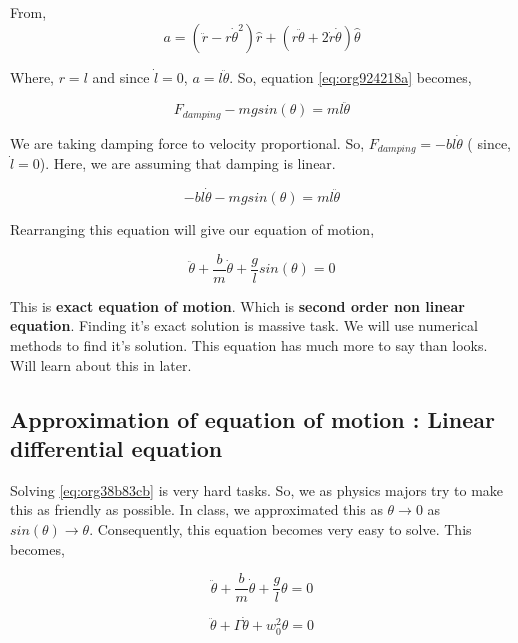 \documentclass[11pt,a4paper]{article}
\begin{document}
From,
\begin{equation*}
\label{eq:orgcb67140}
a = (\ddot{r}-r\dot{\theta}^{2})\hat{r} + (r \ddot{\theta}+2\dot{r}\dot{\theta})\hat{\theta}
\end{equation*}

Where,  \(r=l\) and since \(\dot{l}=0\), \(a=l\ddot{\theta}\). So, equation \ref{eq:org924218a} becomes,

\begin{equation*}
\label{eq:orgff68107}
F_{damping}-mgsin(\theta)=ml\ddot{\theta}
\end{equation*}

We are taking damping force to velocity proportional. So, \(F_{damping}=-bl\dot{\theta}\) ( since, \(\dot{l}=0\)). Here, we are assuming that damping is linear. 

\begin{equation*}
\label{eq:org3933c19}
-bl\dot{\theta}-mgsin(\theta)=ml\ddot{\theta}
\end{equation*}


Rearranging this equation will give our equation of motion,

\begin{equation}
\label{eq:org38b83cb}
\ddot{\theta}+\frac{b}{m}\dot{\theta}+\frac{g}{l}sin(\theta)=0
\end{equation}

This is \textbf{exact equation of motion}. Which is \textbf{second order non linear equation}. Finding it's exact solution is massive task. We will use numerical methods to find it's solution. This equation has much more to say than looks. Will learn about this in later.

\subsection{Approximation of equation of motion : Linear differential equation}
\label{sec:orgb95765f}

Solving \ref{eq:org38b83cb} is very hard tasks. So, we as physics majors try to make this as friendly as possible. In class, we approximated this as \(\theta \to 0\) as \(sin(\theta) \to \theta\). Consequently, this equation becomes very easy to solve. This becomes,

\begin{equation}
\label{eq:org217be5e}
\ddot{\theta}+\frac{b}{m}\dot{\theta}+\frac{g}{l}\theta=0
\end{equation}

\begin{equation}
\label{eq:org7f1424d}
\ddot{\theta}+\Gamma\dot{\theta}+w_{0}^{2}\theta=0
\end{equation}
\end{document}
